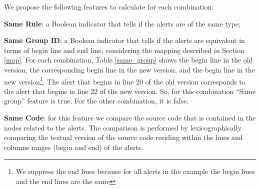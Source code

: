 \documentclass[
]{article}
\begin{document}


We propose the following features to calculate for each combination:

\noindent \textbf{Same Rule}: a Boolean indicator that tells if the alerts are of
the same type;

%
%
%

\noindent \textbf{Same Group ID}: a Boolean indicator that tells if the alerts are
equivalent in terms of begin line and end line, considering the mapping
described in Section \ref{map}. For each combination, Table
\ref{same_group} shows the begin line in the old version, the
corresponding begin line in the new version, and the begin line in the
new
version\footnote{We suppress the end lines because for all alerts in the 
example the begin lines and the end lines are the same}. The alert that
begins in line 20 of the old version corresponds to the alert that
begins in line 22 of the new version. So, for this combination ``Same
group'' feature is true. For the other combination, it is false.

\small

\begin{table}[H]

\caption{\label{tab:unnamed-chunk-7}Same group feature \label{same_group}}
\centering
{}
\end{table}

\normalsize

\noindent \textbf{Same Code}: for this feature we compare the source
code that is contained in the nodes related to the alerts. The
comparison is performed by lexicographically comparing the textual
version of the source code residing within the lines and columns ranges
(begin and end) of the alerts.
\end{document}
